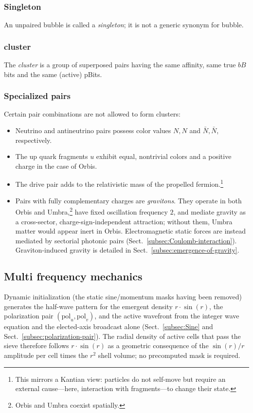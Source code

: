 \documentclass{ijuc}
\begin{document}
\subsubsection{Singleton}
An unpaired bubble is called a \textit{singleton}; it is not a generic synonym for bubble.
\subsubsection{cluster}
The \textit{cluster} is a group of superposed pairs having the same affinity, same true $bB$ bits and the same (active) pBits.
\subsubsection{Specialized pairs} \label{subsec:specialized-pairs}
Certain pair combinations are not allowed to form clusters:
\begin{itemize}
\item Neutrino and antineutrino pairs possess color values $N, N$ and $\bar{N}, \bar{N}$, respectively.
\item The up quark fragments $u$ exhibit equal, nontrivial colors and a positive charge in the case of Orbis.
\item The drive pair adds to the relativistic mass of the propelled fermion.\footnote{This mirrors a Kantian view: particles do not self-move but require an external cause---here, interaction with fragments---to change their state.}
\item Pairs with fully complementary charges are \emph{gravitons}. They operate in both Orbis and Umbra,\footnote{Orbis and Umbra coexist spatially.} have fixed oscillation frequency $2$, and mediate gravity as a cross-sector, charge-sign-independent attraction; without them, Umbra matter would appear inert in Orbis. Electromagnetic static forces are instead mediated by sectorial photonic pairs (Sect.~\ref{subsec:Coulomb-interaction}). Graviton-induced gravity is detailed in Sect.~\ref{subsec:emergence-of-gravity}.
\end{itemize}

\subsection{Multi frequency mechanics}\label{subsec:multi-frequency}
Dynamic initialization (the static sine/momentum masks having been removed) generates the half-wave pattern for the emergent density $r\cdot\sin(r)$, the polarization pair $(\mathrm{pol}_u,\mathrm{pol}_v)$, and the active wavefront from the integer wave equation and the elected-axis broadcast alone (Sect.~\ref{subsec:Sine} and Sect.~\ref{subsec:polarization-pair}). The radial density of active cells that pass the sieve therefore follows $r\cdot\sin(r)$ as a geometric consequence of the $\sin(r)/r$ amplitude per cell times the $r^{2}$ shell volume; no precomputed mask is required.
\end{document}
